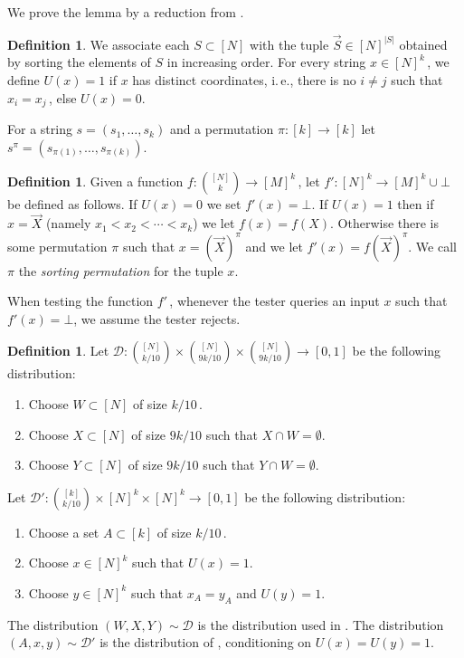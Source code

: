 \documentclass[11pt]{article}
\numberwithin{equation}{section}
\theoremstyle{definition}
\newtheorem{definition}[theorem]{Definition}
\theoremstyle{plain}
\newcommand{\ie}{i.\,e.}
\newcommand\f{f} %
\newcommand\setf{f} %
\newcommand{\sets}{\binom{[N]}{k}} %
\begin{document}
%
We prove the lemma by a reduction from .
\begin{definition}
%
We associate each $S\subset[N]$   %
 with the tuple $\vec S \in [N]^{|S|}$ obtained by sorting the elements of $S$ in increasing order. %
 For every string $x\in[N]^k$\,, we define $U(x)=1$ if $x$ has
%
distinct  %
coordinates, %
\ie, %
there is no $i\neq j$ such that $x_i=x_j$\,, else $U(x)=0$.
\end{definition}

For a string $s=(s_1,\ldots,s_k)$ and a permutation $\pi:[k]\to[k]$ let $s^\pi = (s_{\pi(1)},\ldots,s_{\pi(k)})$. %
\begin{definition}\label{def:tuples from sets function}
	Given a function $\setf:\sets\rightarrow[M]^k$\,, let $\f':[N]^k\rightarrow[M]^k\cup\bot$ be defined as follows. If $U(x)=0$ we set $f'(x)=\bot$. If $U(x)=1$ then if $x = \vec X$ (namely $x_1<x_2 < \cdots < x_k$) we let $f(x) = f(X)$. Otherwise there is some permutation $\pi$ such that $x = (\vec X)^\pi$ and we let
	$f'(x) = f(\vec X)^\pi$. We call $\pi$ the 
%
%
\emph{sorting permutation}  %
for the tuple $x$.
\end{definition}
When testing the function $\f'$\,, whenever the tester queries an input $x$ such that $\f'(x) = \bot$, we assume the tester rejects.


\begin{definition}
	Let $\mathcal{D}:\binom{[N]}{k/10}\times\binom{[N]}{9k/10}\times\binom{[N]}{9k/10}\rightarrow[0,1]$ be the following distribution:
	\begin{enumerate}
		\item Choose  $W\subset[N]$ of size $k/10$\,.
		\item Choose $X\subset[N]$ of size $9k/10$ such that $X\cap W=\emptyset$.
		\item Choose $Y\subset[N]$ of size $9k/10$ such that $Y\cap W=\emptyset$.
	\end{enumerate}
	Let $\mathcal{D}':\binom{[k]}{k/10}\times[N]^k\times[N]^k\rightarrow[0,1]$ be the following distribution:
	\begin{enumerate}
		\item Choose a set $A\subset [k]$ of size $k/10$\,.
		\item Choose $x\in[N]^k$ such that $U(x)=1$.
		\item Choose $y\in[N]^k$ such that $x_A=y_A$ and $U(y)=1$.
	\end{enumerate}
\end{definition}
The distribution $(W,X,Y)\sim\mathcal{D}$ is the distribution used in . The distribution $(A,x,y)\sim\mathcal{D}'$ is the distribution of , conditioning on $U(x)=U(y)=1$.
\end{document}
